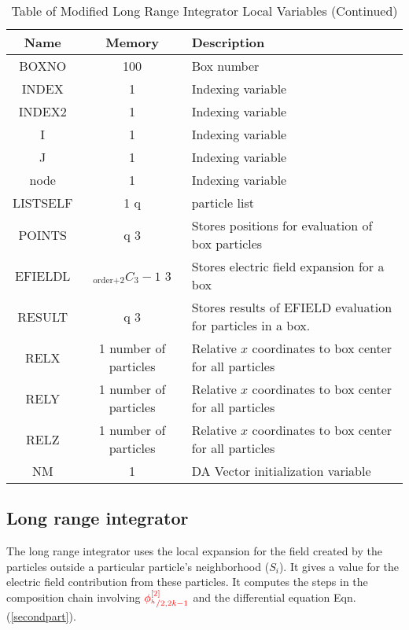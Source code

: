 \documentclass[oneside,12pt]{book}
\begin{document}
\begin{center}
\begin{table}[ht]
\begin{tabular}{|c|c|p{3.5in}|}
\hline
\textbf{Name} & \textbf{Memory} & \textbf{Description}\\
\hline
BOXNO & 100 & Box number \\
\hline
INDEX & 1 & Indexing variable\\
\hline
INDEX2 & 1 & Indexing variable\\
\hline
I & 1 & Indexing variable\\
\hline
J & 1 & Indexing variable\\
\hline
node & 1 & Indexing variable\\
\hline
LISTSELF & 1 q & particle list\\
\hline
POINTS & q 3 & Stores positions for evaluation of box particles\\
\hline
EFIELDL & $_\text{order+2}C_3-1$ 3 & Stores electric field expansion for a box\\
\hline
RESULT & q 3 & Stores results of EFIELD evaluation for particles in a box.\\
\hline
RELX & 1 number of particles & Relative $x$ coordinates to box center for all particles\\
\hline
RELY & 1 number of particles & Relative $x$ coordinates to box center for all particles\\
\hline
RELZ & 1 number of particles & Relative $x$ coordinates to box center for all particles\\
\hline
NM & 1 & DA Vector initialization variable\\
\hline
\end{tabular}
\caption{Table of Modified Long Range Integrator Local Variables (Continued)}
\end{table}
\end{center}

\subsection{Long range integrator}

The long range integrator uses the local expansion for the field created by the particles outside a particular particle's neighborhood ($S_i$).  It gives a value for the electric field contribution from these particles.  It computes the steps in the composition chain involving ${\color{red}\phi^{[2]}_{^h \slash 2,2k-1}}$ and the differential equation Eqn. (\ref{secondpart}).  
\end{document}
